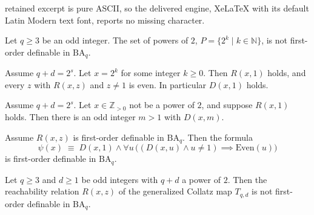 \documentclass[10pt,a4paper]{amsart}
\begin{document}
retained excerpt is pure ASCII, so the delivered engine, XeLaTeX with its default Latin Modern text font, reports no missing character.
\begin{lemma}\label{lem:undefinable_subset}
Let $q \ge 3$ be an odd integer. The set of powers of $2$, $P = \{2^k
\mid k \in \mathbb{N}\}$, is not first-order definable in
$\mathrm{BA}_q$.
\end{lemma}

\begin{lemma}[Powers of $2$]\label{lem:power_two_path}
Assume $q+d = 2^s$. Let $x = 2^k$ for some integer $k \ge 0$. Then
$R(x,1)$ holds, and every $z$ with $R(x,z)$ and $z \ne 1$ is even. In
particular $D(x,1)$ holds.
\end{lemma}

\begin{lemma}\label{lem:non_power_two_path}
Assume $q+d = 2^s$. Let $x \in \mathbb{Z}_{>0}$ not be a power of $2$,
and suppose $R(x,1)$ holds. Then there is an odd integer $m > 1$ with
$D(x,m)$.
\end{lemma}

\begin{lemma}\label{lem:extraction}
Assume $R(x,z)$ is first-order definable in $\mathrm{BA}_q$. Then the
formula
\[
\psi(x) \;\equiv\; D(x,1) \land \forall u\,\bigl( (D(x,u) \land u \neq
1) \implies \mathrm{Even}(u) \bigr)
\]
is first-order definable in $\mathrm{BA}_q$.
\end{lemma}

\begin{theorem}\label{thm:main}
Let $q \ge 3$ and $d \ge 1$ be odd integers with $q+d$ a power of $2$.
Then the reachability relation $R(x,z)$ of the generalized Collatz map
$T_{q,d}$ is not first-order definable in $\mathrm{BA}_q$.
\end{theorem}
\end{document}
